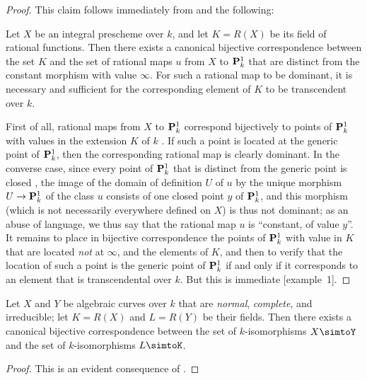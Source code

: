 \begin{proof}
This claim follows immediately from  and the following:
\begin{lemma}
\label{II.7.4.15.1}
Let $X$ be an integral prescheme over $k$, and let $K=R(X)$ be its field of rational functions.
Then there exists a canonical bijective correspondence between the set $K$ and the set of rational maps $u$ from $X$ to $\mathbf{P}_k^1$ that are distinct from the constant morphism with value $\infty$.
For such a rational map to be dominant, it is necessary and sufficient for the corresponding element of $K$ to be transcendent over $k$.
\end{lemma}
First of all, rational maps from $X$ to $\mathbf{P}_k^1$ correspond bijectively to points of $\mathbf{P}_k^1$ with values in the extension $K$ of $k$ .
If such a point is located  at the generic point of $\mathbf{P}_k^1$, then the corresponding rational map is clearly dominant.
In the converse case, since every point of $\mathbf{P}_k^1$ that is distinct from the generic point is closed , the image of the domain of definition $U$ of $u$ by the unique morphism $U\to\bb{P}_k^1$ of the class $u$  consists of one closed point $y$ of $\mathbf{P}_k^1$, and this morphism (which is not necessarily everywhere defined on $X$) is thus not dominant;
as an abuse of language, we thus say that the rational map $u$ is ``constant, of value $y$''.
It remains to place in bijective correspondence the points of $\mathbf{P}_k^1$ with value in $K$ that are located  \emph{not} at $\infty$, and the elements of $K$, and then to verify that the location of such a point is the generic point of $\mathbf{P}_k^1$ if and only if it corresponds to an
element that is transcendental over $k$.
But this is immediate [example~1].
\end{proof}

\begin{corollary}[7.4.16]
\label{II.7.4.16}
Let $X$ and $Y$ be algebraic curves over $k$ that are \emph{normal}, \emph{complete}, and irreducible;
let $K=R(X)$ and $L=R(Y)$ be their fields.
Then there exists a canonical bijective correspondence between the set of $k$-isomorphisms $X\simtoY$ and the set of $k$-isomorphisms $L\simtoK$.
\end{corollary}

\begin{proof}
This is an evident consequence of .
\end{proof}

